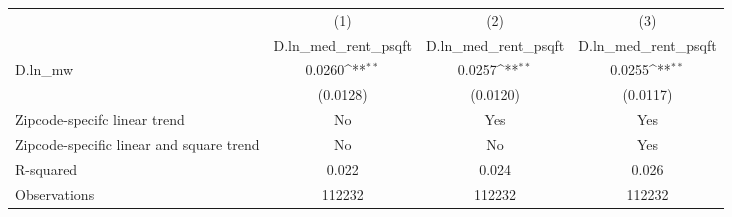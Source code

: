 {
\def\sym#1{\ifmmode^{#1}\else\(^{#1}\)\fi}
\begin{tabular}{l*{3}{c}}
\hline\hline
          &\multicolumn{1}{c}{(1)}&\multicolumn{1}{c}{(2)}&\multicolumn{1}{c}{(3)}\\
          &\multicolumn{1}{c}{D.ln\_med\_rent\_psqft}&\multicolumn{1}{c}{D.ln\_med\_rent\_psqft}&\multicolumn{1}{c}{D.ln\_med\_rent\_psqft}\\
\hline
D.ln\_mw   &   0.0260\sym{**} &   0.0257\sym{**} &   0.0255\sym{**} \\
          & (0.0128)         & (0.0120)         & (0.0117)         \\
\hline
Zipcode-specifc linear trend&       No         &      Yes         &      Yes         \\
Zipcode-specific linear and square trend&       No         &       No         &      Yes         \\
R-squared &    0.022         &    0.024         &    0.026         \\
Observations&   112232         &   112232         &   112232         \\
\hline\hline
\end{tabular}
}
